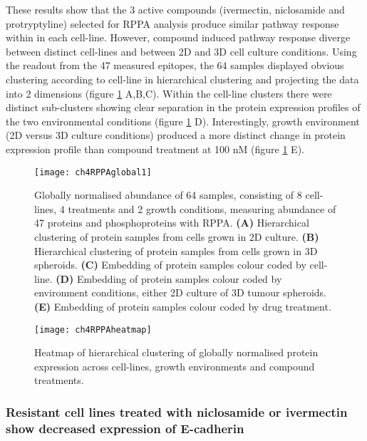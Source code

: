 \documentclass[a4paper,11pt,twoside,openright]{scrbook}
\begin{document}
These results show that the 3 active compounds (ivermectin, niclosamide and protryptyline) selected for RPPA analysis 
produce similar pathway response within in each cell-line.
However, compound induced pathway response diverge between distinct cell-lines and between 2D and 3D cell culture 
conditions.
Using the readout from the 47 measured epitopes, the 64 samples displayed obvious clustering according to cell-line in 
hierarchical clustering and projecting the data into 2 dimensions (figure \ref{figure:rppa_global_1} A,B,C).
Within the cell-line clusters there were distinct sub-clusters showing clear separation in the protein expression 
profiles of the two environmental conditions (figure \ref{figure:rppa_global_1} D).
Interestingly, growth environment (2D versus 3D culture conditions) produced a more distinct change in protein 
expression profile than compound treatment at 100 nM (figure \ref{figure:rppa_global_1} E).


\begin{figure}
    \texttt{[image: ch4RPPAglobal1]}
    \captionsetup{width=0.8\textwidth}
    \caption[Hierarchical clustering of RPPA samples.]{
        Globally normalised abundance of 64 samples, consisting of 8 cell-lines, 4 treatments and 2 growth conditions, 
measuring abundance of 47 proteins and phosphoproteins with RPPA.
        \textbf{(A)} Hierarchical clustering of protein samples from cells grown in 2D culture.
        \textbf{(B)} Hierarchical clustering of protein samples from cells grown in 3D spheroids.
        \textbf{(C)} Embedding of protein samples colour coded by cell-line.
        \textbf{(D)} Embedding of protein samples colour coded by environment conditions, either 2D culture of 3D 
tumour spheroids.
        \textbf{(E)} Embedding of protein samples colour coded by drug treatment.
    }
    \label{figure:rppa_global_1}
\end{figure}


\begin{figure}
    \texttt{[image: ch4RPPAheatmap]}
    \captionsetup{width=0.8\textwidth}
    \caption[Heatmap and clustering of RPPA data]{
        Heatmap of hierarchical clustering of globally normalised protein expression across cell-lines, growth 
environments and compound treatments.
    }
    \label{figure:rppa_heatmap}
\end{figure}


\subsubsection{Resistant cell lines treated with niclosamide or ivermectin show decreased expression of E-cadherin}
\end{document}
